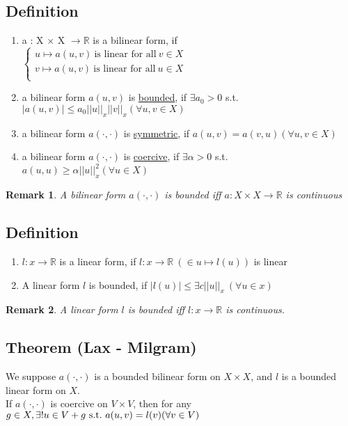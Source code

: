 \documentclass[a4paper,12pt]{article}
\newtheorem{remark}{Remark}[]
\newcommand{\R}{\mathbb{R}}
\begin{document}
\subsection{Definition}
\begin{enumerate}
	\item a : X $\times$ X $\rightarrow \R$ is a bilinear form, if\\
	$\begin{cases}
	u \mapsto a(u,v)\ \text{is linear for all}\ v \in X\\
	v \mapsto a(u,v)\ \text{is linear for all}\ u \in X\\
	\end{cases}$
	\item a bilinear form $a(u,v)$ is \underline{bounded}, if $\exists a_0>0$ s.t. $|a(u,v)| \leq a_0 ||u||_x ||v||_x (\forall u,v\in X)$
	\item a bilinear form $a(\cdot,\cdot)$ is \underline{symmetric}, if $a(u,v) = a(v,u)(\forall u,v \in X)$
	\item a bilinear form $a(\cdot,\cdot)$ is \underline{coercive}, if $\exists \alpha > 0$ s.t. $a(u,u)\geq \alpha ||u||^2_x (\forall u \in X)$
\end{enumerate}
\begin{remark}
	A bilinear form $a(\cdot,\cdot)$ is bounded iff $a: X \times X \rightarrow \R$ is continuous
\end{remark}
\subsection{Definition}
\begin{enumerate}
	\item $l: x \rightarrow \R$ is a linear form, if $l: x \rightarrow \R\ (\in u \mapsto l(u))$ is linear
	\item A linear form $l$ is bounded, if $|l(u)| \leq \exists c||u||_x\ (\forall u \in x)$
\end{enumerate}
\begin{remark}
	A linear form $l$ is bounded iff $l: x \rightarrow \R$ is continuous.
\end{remark}
\subsection{Theorem (Lax - Milgram)}
We suppose $a(\cdot,\cdot)$ is a bounded bilinear form on $X\times X$, and $l$ is a bounded linear form on $X$.\\
If $a(\cdot,\cdot)$ is coercive on $V\times V$, then for any $g\in X,\\ \exists! u\in V+g\ \text{s.t.}\ a(u,v)=l(v)(\forall v \in V)$
\end{document}
